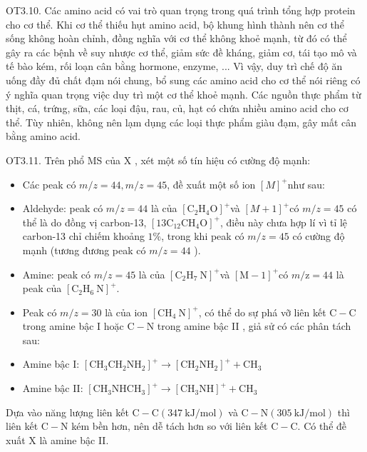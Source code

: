 \documentclass[10pt]{article}
\begin{document}
OT3.10. Các amino acid có vai trò quan trọng trong quá trình tổng hợp protein cho cơ thể. Khi cơ thể thiếu hụt amino acid, bộ khung hình thành nên cơ thể sống không hoàn chỉnh, đồng nghĩa với cơ thể không khoẻ mạnh, từ đó có thể gây ra các bệnh về suy nhược cơ thể, giảm sức đề kháng, giảm cơ, tái tạo mô và tế bào kém, rối loạn cân bằng hormone, enzyme, ... Vì vậy, duy trì chế độ ăn uống đầy đủ chất đạm nói chung, bổ sung các amino acid cho cơ thể nói riêng có ý nghĩa quan trọng việc duy trì một cơ thể khoẻ mạnh. Các nguồn thực phẩm từ thịt, cá, trứng, sữa, các loại đậu, rau, củ, hạt có chứa nhiều amino acid cho cơ thể. Tùy nhiên, không nên lạm dụng các loại thực phẩm giàu đạm, gây mất cân bằng amino acid.

OT3.11. Trên phổ MS của X , xét một số tín hiệu có cường độ mạnh:

\begin{itemize}
  \item Các peak có $m / z=44, m / z=45$, đề xuất một số ion $[M]^{+}$như sau:
  \item Aldehyde: peak có $m / z=44$ là của $\left[\mathrm{C}_{2} \mathrm{H}_{4} \mathrm{O}\right]^{+}$và $[M+1]^{+}$có $m / z=45$ có thể là do đồng vị carbon-13, $\left[13 \mathrm{C}_{12} \mathrm{CH}_{4} \mathrm{O}\right]^{+}$, điều này chưa hợp lí vì tỉ lệ carbon-13 chỉ chiếm khoảng $1 \%$, trong khi peak có $m / z=45$ có cường độ mạnh (tương đương peak có $m / z=44$ ).
  \item Amine: peak có $m / z=45$ là của $\left[\mathrm{C}_{2} \mathrm{H}_{7} \mathrm{~N}\right]^{+}$và $[\mathrm{M}-1]^{+}$có $m / \mathrm{z}=44$ là peak của $\left[\mathrm{C}_{2} \mathrm{H}_{6} \mathrm{~N}\right]^{+}$.
  \item Peak có $m / z=30$ là của ion $\left[\mathrm{CH}_{4} \mathrm{~N}\right]^{+}$, có thể do sự phá vỡ liên kết $\mathrm{C}-\mathrm{C}$ trong amine bậc I hoặc $\mathrm{C}-\mathrm{N}$ trong amine bậc II , giả sử có các phân tách sau:
  \item Amine bậc I: $\left[\mathrm{CH}_{3} \mathrm{CH}_{2} \mathrm{NH}_{2}\right]^{+} \rightarrow\left[\mathrm{CH}_{2} \mathrm{NH}_{2}\right]^{+}+\mathrm{CH}_{3}$
  \item Amine bậc II: $\left[\mathrm{CH}_{3} \mathrm{NHCH}_{3}\right]^{+} \rightarrow\left[\mathrm{CH}_{3} \mathrm{NH}\right]^{+}+\mathrm{CH}_{3}$
\end{itemize}

Dựa vào năng lượng liên kết $\mathrm{C}-\mathrm{C}(347 \mathrm{~kJ} / \mathrm{mol})$ và $\mathrm{C}-\mathrm{N}(305 \mathrm{~kJ} / \mathrm{mol})$ thì liên kết $\mathrm{C}-\mathrm{N}$ kém bền hơn, nên dễ tách hơn so với liên kết $\mathrm{C}-\mathrm{C}$. Có thể đề xuất X là amine bậc II.
\end{document}
